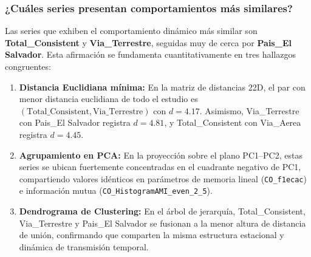 \documentclass[11pt, a4paper]{article}
\begin{document}
\subsubsection{¿Cuáles series presentan comportamientos más similares?}
Las series que exhiben el comportamiento dinámico más similar son \textbf{Total\_Consistent} y \textbf{Via\_Terrestre}, seguidas muy de cerca por \textbf{Pais\_El Salvador}. Esta afirmación se fundamenta cuantitativamente en tres hallazgos congruentes:
\begin{enumerate}
    \item \textbf{Distancia Euclidiana mínima:} En la matriz de distancias 22D, el par con menor distancia euclidiana de todo el estudio es $(\text{Total\_Consistent}, \text{Via\_Terrestre})$ con $d = 4.17$. Asimismo, Via\_Terrestre con Pais\_El Salvador registra $d = 4.81$, y Total\_Consistent con Via\_Aerea registra $d = 4.45$.
    \item \textbf{Agrupamiento en PCA:} En la proyección sobre el plano PC1--PC2, estas series se ubican fuertemente concentradas en el cuadrante negativo de PC1, compartiendo valores idénticos en parámetros de memoria lineal (\texttt{CO\_f1ecac}) e información mutua (\texttt{CO\_HistogramAMI\_even\_2\_5}).
    \item \textbf{Dendrograma de Clustering:} En el árbol de jerarquía, Total\_Consistent, Via\_Terrestre y Pais\_El Salvador se fusionan a la menor altura de distancia de unión, confirmando que comparten la misma estructura estacional y dinámica de transmisión temporal.
\end{enumerate}
\end{document}
